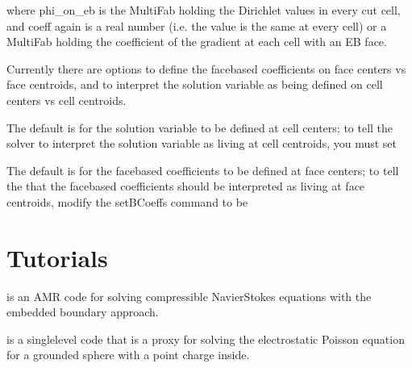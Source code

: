 \documentclass[letterpaper,10pt,english]{sphinxmanual}
\begin{document}
\sphinxAtStartPar
where phi\_on\_eb is the MultiFab holding the Dirichlet values in every cut cell,
and coeff again is a real number (i.e. the value is the same at every cell)
or a MultiFab holding the coefficient of the gradient at each cell with an EB face.

\sphinxAtStartPar
Currently there are options to define the face\sphinxhyphen{}based coefficients on
face centers vs face centroids, and to interpret the solution variable
as being defined on cell centers vs cell centroids.

\sphinxAtStartPar
The default is for the solution variable to be defined at cell centers;
to tell the solver to interpret the solution variable as living
at cell centroids, you must set

\begin{sphinxVerbatim}[commandchars=\\\{\}]
\end{sphinxVerbatim}

\sphinxAtStartPar
The default is for the face\sphinxhyphen{}based coefficients to be defined at face centers;
to tell the that the face\sphinxhyphen{}based coefficients should be interpreted
as living at face centroids, modify the setBCoeffs command to be

\begin{sphinxVerbatim}[commandchars=\\\{\}]
  
\end{sphinxVerbatim}


\section{Tutorials}
\label{\detokenize{EB:tutorials}}
\sphinxAtStartPar
{} is an AMR code for solving compressible
Navier\sphinxhyphen{}Stokes equations with the embedded boundary approach.

\sphinxAtStartPar
{} is a single\sphinxhyphen{}level code that is a proxy for
solving the electrostatic Poisson equation for a grounded sphere with a point
charge inside.
\end{document}
